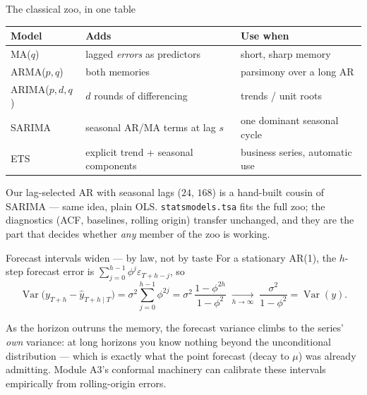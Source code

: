 \documentclass[aspectratio=169,11pt]{beamer}
\begin{document}
\begin{frame}{The classical zoo, in one table}
  \footnotesize
  \begin{center}
  \begin{tabular}{@{}lll@{}}
    \toprule
    \textbf{Model} & \textbf{Adds} & \textbf{Use when} \\
    \midrule
    MA($q$) & lagged \emph{errors} as predictors & short, sharp memory \\
    ARMA($p,q$) & both memories & parsimony over a long AR \\
    ARIMA($p,d,q$) & $d$ rounds of differencing & trends / unit roots \\
    SARIMA & seasonal AR/MA terms at lag $s$ & one dominant seasonal cycle \\
    ETS & explicit trend + seasonal components & business series, automatic use \\
    \bottomrule
  \end{tabular}
  \end{center}
  \begin{readme}
    Our lag-selected AR with seasonal lags ($24$, $168$) is a hand-built cousin of
    SARIMA --- same idea, plain OLS. \texttt{statsmodels.tsa} fits the full zoo;
    the diagnostics (ACF, baselines, rolling origin) transfer unchanged, and they
    are the part that decides whether \emph{any} member of the zoo is working.
  \end{readme}
\end{frame}

\begin{frame}{Forecast intervals widen --- by law, not by taste}
  \footnotesize
  For a stationary AR(1), the $h$-step forecast error is
  $\sum_{j=0}^{h-1} \phi^j \varepsilon_{T+h-j}$, so
  \[
    \operatorname{Var}\big(y_{T+h} - \hat y_{T+h\mid T}\big)
      = \sigma^2 \sum_{j=0}^{h-1} \phi^{2j}
      = \sigma^2\,\frac{1 - \phi^{2h}}{1 - \phi^2}
      \;\xrightarrow[h \to \infty]{}\; \frac{\sigma^2}{1 - \phi^2}
      = \operatorname{Var}(y).
  \]
  \begin{takeaway}
    As the horizon outruns the memory, the forecast variance climbs to the
    series' \emph{own} variance: at long horizons you know nothing beyond the
    unconditional distribution --- which is exactly what the point forecast
    (decay to $\mu$) was already admitting. Module A3's conformal machinery can
    calibrate these intervals empirically from rolling-origin errors.
  \end{takeaway}
\end{frame}
\end{document}
